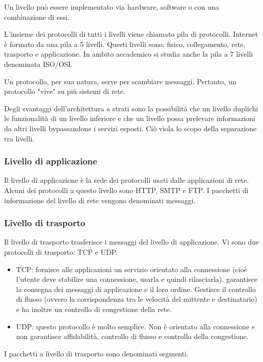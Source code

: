 \documentclass{book}
\begin{document}
Un livello può essere implementato via hardware, software o con una combinazione di essi.

L'insieme dei protocolli di tutti i livelli viene chiamato pila di protocolli. Internet è formato da una pila a 5 livelli. Questi livelli sono: fisico, collegamento, rete, trasporto e applicazione. In ambito accademico si studia anche la pila a 7 livelli denominata ISO/OSI.

Un protocollo, per sua natura, serve per scambiare messaggi. Pertanto, un protocollo "vive" su più sistemi di rete.

Degli svantaggi dell'architettura a strati sono la possibilità che un livello duplichi le funzionalità di un livello inferiore e che un livello possa prelevare informazioni da altri livelli bypassandone i servizi esposti. Ciò viola lo scopo della separazione tra livelli.

\subsubsection{Livello di applicazione}
Il livello di applicazione è la sede dei protocolli usati dalle applicazioni di rete. Alcuni dei protocolli a questo livello sono HTTP, SMTP e FTP. I pacchetti di informazione del livello di rete vengono denominati messaggi.

\subsubsection{Livello di trasporto}
Il livello di trasporto trasferisce i messaggi del livello di applicazione. Vi sono due protocolli di trasporto: TCP e UDP.

\begin{itemize}
	\item TCP: fornisce alle applicazioni un servizio orientato alla connessione (cioè l'utente deve stabilire una connessione, usarla e quindi rilasciarla), garantisce la consegna dei messaggi di applicazione e il loro ordine. Gestisce il controllo di flusso (ovvero la corrispondenza tra le velocità del mittente e destinatario) e ha inoltre un controllo di congestione della rete.
	
	\item UDP: questo protocollo è molto semplice. Non è orientato alla connessione e non garantisce affidabilità, controllo di flusso e controllo della congestione.
\end{itemize}
I pacchetti a livello di trasporto sono denominati segmenti.
\end{document}
